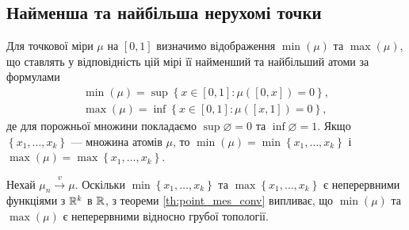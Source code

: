 \subsection{Найменша та найбільша нерухомі точки}
Для точкової міри $\mu$ на $[0, 1]$ визначимо відображення
$\min(\mu)$ та $\max(\mu)$, що ставлять у відповідність
цій мірі її найменший та найбільший атоми за формулами
\begin{gather}
    \min(\mu) = \sup \left\{x\in[0,1] :\mu([0, x]) = 0 \right\}, \\
    \max(\mu) = \inf \left\{x\in[0,1] :\mu([x, 1]) = 0 \right\},
\end{gather}
де для порожньої множини
покладаємо $\sup \varnothing = 0$ та $\inf \varnothing = 1$.
Якщо $\left\{x_1,\dots,x_k \right\}$ --- множина атомів $\mu$,
то  
$\min(\mu) = \min\left\{x_1,\dots,x_k \right\}$ і 
$\max(\mu) = \max\left\{x_1,\dots,x_k \right\}$.

Нехай $\mu_n \overset{v}{\longrightarrow} \mu$.
Оскільки $\min\left\{x_1,\dots,x_k \right\}$ та
$\max\left\{x_1,\dots,x_k \right\}$ є неперервними функціями з $\mathbb{R}^k$ в $\mathbb{R}$, 
з теореми \ref{th:point_mes_conv}
випливає, що $\min(\mu)$ та $\max(\mu)$ 
є неперервними відносно грубої топології.

